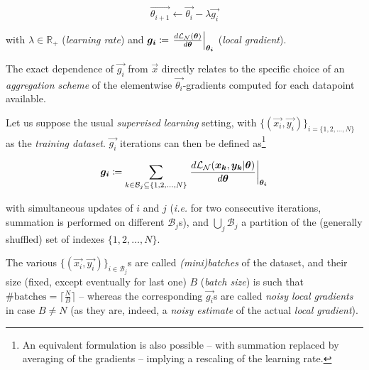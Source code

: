 \begin{equation} \label{eq:1}
    \vec{\theta_{i+1}} \leftarrow  \vec{\theta_{i}} - \lambda\vec{g_i}
\end{equation}

with $\lambda \in \mathbb{R}_+$ (\textit{learning rate}) and $\bm{g_i} \coloneqq \left.\frac{\mathop{d\mathcal{L}_{\mathcal{N}}(\bm{\theta})}}{\mathop{d\bm{\theta}}} \right|_{\bm{\theta_{i}}}$ (\textit{local gradient}).

The exact dependence of $\vec{g_i}$ from $\vec{x}$ directly relates to the specific choice of an \textit{aggregation scheme} of the elementwise $\vec{\theta_{i}}$-gradients computed for each datapoint available.

Let us suppose the usual \textit{supervised learning} setting, with $\{(\vec{x_i}, \vec{y_i})\}_{i = \{1,2,\dots,N\}}$ as the \textit{training dataset}. $\vec{g_i}$ iterations can then be defined as\footnote{An equivalent formulation is also possible -- with summation replaced by averaging of the gradients -- implying a rescaling of the learning rate.}

$$\bm{g_i} \coloneqq \sum_{k \in \mathcal{B}_j \subseteq \{1,2,\dots,N\}}{\left.\frac{\mathop{d\mathcal{L}_{\mathcal{N}}(\bm{x_k}, \bm{y_k}|\bm{\theta})}}{\mathop{d\bm{\theta}}} \right|_{\bm{\theta_{i}}}}$$

with simultaneous updates of $i$ and $j$ (\textit{i.e.} for two consecutive iterations, summation is performed on different $\mathcal{B}_j$s), and $\bigcup_j\mathcal{B}_j$ a partition of the (generally shuffled) set of indexes $\{1,2,\dots,N\}$.

The various $\{(\vec{x_i}, \vec{y_i})\}_{i \in \mathcal{B}_j}$s are called \textit{(mini)batches} of the dataset, and their size (fixed, except eventually for last one) $B$ (\textit{batch size}) is such that $\#\text{batches} = \lceil \frac{N}{B}\rceil$ -- whereas the corresponding $\vec{g_i}$s are called \textit{noisy local gradients} in case $B \neq N$ (as they are, indeed, a \textit{noisy estimate} of the actual \textit{local gradient}).

